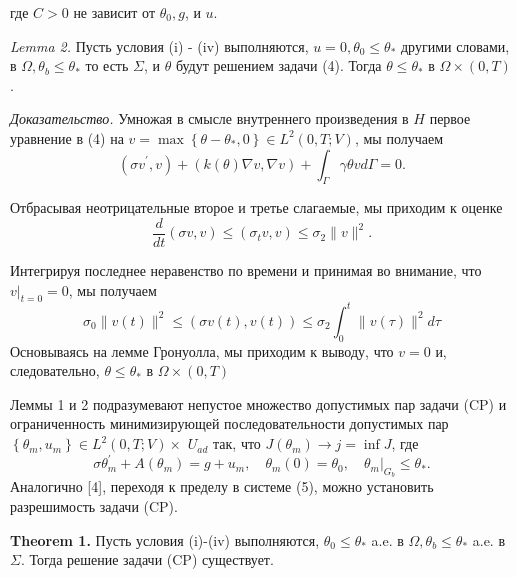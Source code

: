 где $C>0$ не зависит от $\theta_{0}, g$, и $u$.

\textit{Lemma 2.}
Пусть условия (i) - (iv) выполняются, $u=0, \theta_{0} \leq \theta_{*}$ другими словами,
в $\Omega, \theta_{b} \leq \theta_{*}$ то есть $\Sigma$, и $\theta$ будут решением задачи (4).
Тогда $\theta \leq \theta_{*}$ в $\Omega \times(0, T)$.

\textit{Доказательство.}
Умножая в смысле внутреннего произведения в $H$ первое уравнение в (4) на
$v=\max \left\{\theta-\theta_{*}, 0\right\}\in L^{2}(0, T; V)$, мы получаем
\[
    \left(\sigma v^{\prime}, v\right)+(k(\theta) \nabla v, \nabla v)
    + \int_{\Gamma} \gamma \theta v d \Gamma=0.
\]

Отбрасывая неотрицательные второе и третье слагаемые, мы приходим к оценке
\[
    \frac{d}{d t}(\sigma v, v) \leq\left(\sigma_{t} v, v\right) \leq \sigma_{2}\|v\|^{2}.
\]

Интегрируя последнее неравенство по времени и принимая во внимание,
что $\left.v\right|_{t=0}=0$, мы получаем
\[
    \sigma_{0}\|v(t)\|^{2} \leq(\sigma v(t), v(t))
    \leq \sigma_{2} \int_{0}^{t}\|v(\tau)\|^{2} d \tau
\]
Основываясь на лемме Гронуолла, мы приходим к выводу, что $v=0$ и, следовательно,
$\theta \leq \theta_{*}$ в $\Omega \times(0, T)$

Леммы 1 и 2 подразумевают непустое множество допустимых пар задачи (CP)
и ограниченность минимизирующей последовательности допустимых пар
$\left\{\theta_{m}, u_{m}\right\} \in L^{2}(0, T ; V) \times$
$U_{a d}$ так, что $J\left(\theta_{m}\right) \rightarrow j=\inf J$, где
\[
    \sigma \theta_{m}^{\prime}+A\left(\theta_{m}\right)=g+u_{m},
    \quad \theta_{m}(0)=\theta_{0},\left.\quad \theta_{m}\right|_{G_{b}} \leq \theta_{*}.
\]
Аналогично [4], переходя к пределу в системе (5), можно установить разрешимость задачи (CP).

\textbf{Theorem 1.}
Пусть условия (i)-(iv) выполняются,
$\theta_{0} \leq \theta_{*}$ a.e. в $\Omega, \theta_{b} \leq \theta_{*}$ a.e. в $\Sigma$.
Тогда решение задачи (CP) существует.

